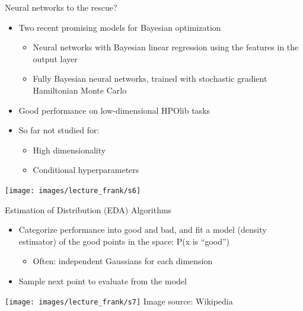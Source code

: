 {
\begin{frame}[c]{Neural networks to the rescue?}
\begin{itemize}
	\item Two recent promising models for Bayesian optimization
	\begin{itemize}
		\item Neural networks with Bayesian linear regression
		using the features in the output layer 
		\item Fully Bayesian neural networks, trained with stochastic gradient
		Hamiltonian Monte Carlo 
	\end{itemize}
\end{itemize}
\begin{minipage}{0.5\textwidth}
	\begin{itemize}
		\item Good performance on low-dimensional HPOlib tasks
		\item So far not studied for:
		\begin{itemize}
			\item High dimensionality
			\item Conditional hyperparameters
		\end{itemize}
	\end{itemize}
\end{minipage}
\begin{minipage}{0.49\textwidth}
	\centering
	\texttt{[image: images/lecture\_frank/s6]}
\end{minipage}
\end{frame}
}
\begin{frame}[c]{Estimation of Distribution (EDA) Algorithms}
\begin{itemize}
	\item Categorize performance into good and bad, and fit a
	model (density estimator) of the good points in the
	space: \alert{P(x is “good”)}
	\begin{itemize}
		\item Often: independent Gaussians for each dimension
	\end{itemize}
	\item Sample next point to evaluate from the model
\end{itemize}
{\centering
	\texttt{[image: images/lecture\_frank/s7]}
	Image source: Wikipedia
}
\end{frame}
